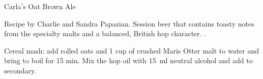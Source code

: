 \begin{recipe}{Carla's Oat Brown Ale}

\begin{aboutblock}
Recipe by Charlie and Sandra Papazian. Session beer that contains toasty notes
from the specialty malts and a balanced, British hop character.
.
\end{aboutblock}


\begin{methodandtiming}

\begin{mashsteps}
\end{mashsteps}

\begin{fermentationsteps}
\end{fermentationsteps}

\begin{directions}
Cereal mash: add rolled oats and 1 cup of crushed Maris Otter malt to 
water and bring to boil for 15 min. Mix the hop oil with 15~ml neutral alcohol
and add to secondary.
\end{directions}

\end{methodandtiming}

\recipebreak

\begin{ingredientsblock}

\begin{malts}
\end{malts}

\begin{hops}
\end{hops}


\end{ingredientsblock}
\end{recipe}
